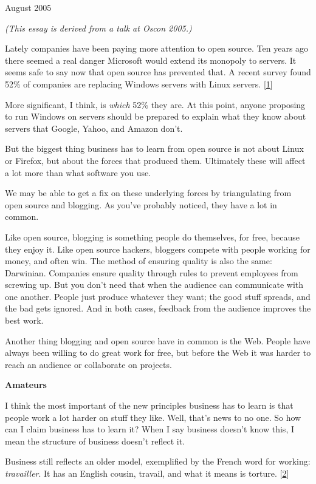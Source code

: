 August 2005

\emph{(This essay is derived from a talk at Oscon 2005.)}

Lately companies have been paying more attention to open source. Ten
years ago there seemed a real danger Microsoft would extend its monopoly
to servers. It seems safe to say now that open source has prevented
that. A recent survey found 52\% of companies are replacing Windows
servers with Linux servers. {[}\hyperref[f1n]{1}{]}

More significant, I think, is \emph{which} 52\% they are. At this point,
anyone proposing to run Windows on servers should be prepared to explain
what they know about servers that Google, Yahoo, and Amazon don't.

But the biggest thing business has to learn from open source is not
about Linux or Firefox, but about the forces that produced them.
Ultimately these will affect a lot more than what software you use.

We may be able to get a fix on these underlying forces by triangulating
from open source and blogging. As you've probably noticed, they have a
lot in common.

Like open source, blogging is something people do themselves, for free,
because they enjoy it. Like open source hackers, bloggers compete with
people working for money, and often win. The method of ensuring quality
is also the same: Darwinian. Companies ensure quality through rules to
prevent employees from screwing up. But you don't need that when the
audience can communicate with one another. People just produce whatever
they want; the good stuff spreads, and the bad gets ignored. And in both
cases, feedback from the audience improves the best work.

Another thing blogging and open source have in common is the Web. People
have always been willing to do great work for free, but before the Web
it was harder to reach an audience or collaborate on projects.

\textbf{Amateurs}

I think the most important of the new principles business has to learn
is that people work a lot harder on stuff they like. Well, that's news
to no one. So how can I claim business has to learn it? When I say
business doesn't know this, I mean the structure of business doesn't
reflect it.

Business still reflects an older model, exemplified by the French word
for working: \emph{travailler}. It has an English cousin, travail, and
what it means is torture. {[}\hyperref[f2n]{2}{]}

